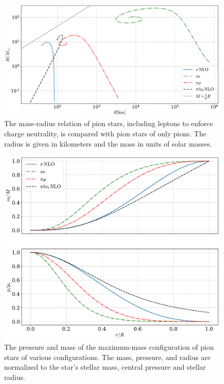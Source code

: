 \begin{figure}[H]
    \centering
    \includegraphics[width=.85\textwidth]{../scripts/figurer/pion_star/mass_radius_all.pdf}
    \caption{
        The mass-radius relation of pion stars, including leptons to enforce charge neutrality, is compared with pion stars of only pions.
        The radius is given in kilometers and the mass in units of solar masses.
        }
        \label{fig: mass-radius relation with leptons}
\end{figure}

\begin{figure}[H]
    \centering
    \includegraphics[width=.85\textwidth]{../scripts/figurer/pion_star/max_pressure_mass.pdf}
    \caption{
        The pressure and mass of the maximum-mass configuration of pion stars of various configurations.
        The mass, pressure, and radius are normalized to the star's stellar mass, central pressure and stellar radius.
        }
        \label{fig: max pressure and mass}
\end{figure}

